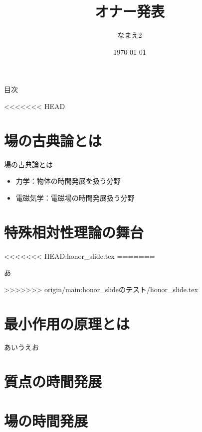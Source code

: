 \title[オナー発表]{オナー発表} %
\author[なまえ1]{なまえ2}     %
\date{\today}                 %




\begin{frame}
  \titlepage
\end{frame}

\begin{frame}{目次}
  \tableofcontents
\end{frame}

<<<<<<< HEAD
\section{場の古典論とは}

\begin{frame}{場の古典論とは}
  \begin{itemize}
    \item 力学：物体の時間発展を扱う分野
    \item 電磁気学：電磁場の時間発展扱う分野
  \end{itemize}
\end{frame}



\section{特殊相対性理論の舞台}

<<<<<<< HEAD:honor_slide.tex
=======
\begin{frame}
  あ
\end{frame}



>>>>>>> origin/main:honor_slideのテスト/honor_slide.tex
\section{最小作用の原理とは}

\begin{frame}
  あいうえお
\end{frame}


\section{質点の時間発展}



\section{場の時間発展}




